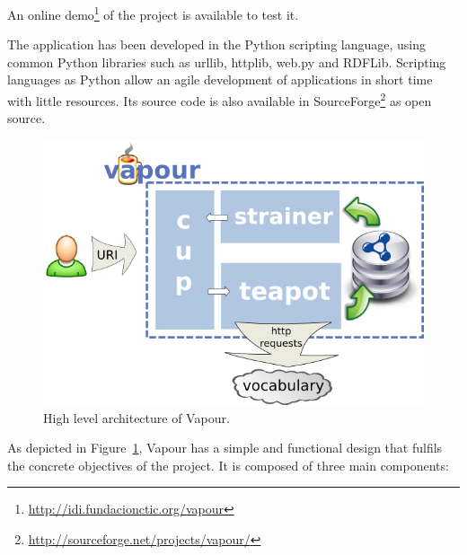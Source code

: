 \documentclass{../templates/llncs}
\begin{document}
An online demo\footnote{\url{http://idi.fundacionctic.org/vapour}} of the project
is available to test it.

The application has been developed in the Python scripting language, using common
Python libraries such as urllib, httplib, web.py and RDFLib. Scripting languages as
Python allow an agile development of applications in short time with little resources. 
Its source code is also available in 
SourceForge\footnote{\url{http://sourceforge.net/projects/vapour/}} 
as open source.

\begin{figure}
 \centering
 \includegraphics[width=12cm]{images/arch.png}
 \caption{\label{fig:arch}High level architecture of Vapour.}
\end{figure}

As depicted in Figure~\ref{fig:arch}, Vapour has a simple and functional
design that fulfils the concrete objectives of the project. It is composed of three
main components:
\end{document}
